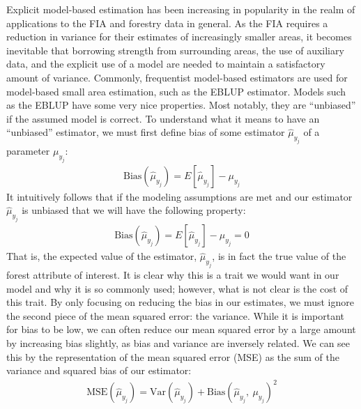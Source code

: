 \documentclass[12pt,twoside]{reedthesis}
\begin{document}
Explicit model-based estimation has been increasing in popularity in the realm of applications to the FIA and forestry data in general. As the FIA requires a reduction in variance for their estimates of increasingly smaller areas, it becomes inevitable that borrowing strength from surrounding areas, the use of auxiliary data, and the explicit use of a model are needed to maintain a satisfactory amount of variance. Commonly, frequentist model-based estimators are used for model-based small area estimation, such as the EBLUP estimator. Models such as the EBLUP have some very nice properties. Most notably, they are ``unbiased'' if the assumed model is correct. To understand what it means to have an ``unbiased'' estimator, we must first define bias of some estimator \(\hat\mu_{y_j}\) of a parameter \(\mu_{y_j}\):
\begin{align}
\text{Bias}(\hat\mu_{y_j}) = E[\hat\mu_{y_j}] - \mu_{y_j}
\end{align}
It intuitively follows that if the modeling assumptions are met and our estimator \(\hat\mu_{y_j}\) is unbiased that we will have the following property:
\begin{align}
\text{Bias}(\hat\mu_{y_j}) = E[\hat\mu_{y_j}] - \mu_{y_j} = 0
\end{align}
That is, the expected value of the estimator, \(\hat\mu_{y_j}\), is in fact the true value of the forest attribute of interest. It is clear why this is a trait we would want in our model and why it is so commonly used; however, what is not clear is the cost of this trait. By only focusing on reducing the bias in our estimates, we must ignore the second piece of the mean squared error: the variance. While it is important for bias to be low, we can often reduce our mean squared error by a large amount by increasing bias slightly, as bias and variance are inversely related. We can see this by the representation of the mean squared error (MSE) as the sum of the variance and squared bias of our estimator:
\begin{align}
\text{MSE}(\hat\mu_{y_j}) = \text{Var}(\hat\mu_{y_j}) + \text{Bias}(\hat\mu_{y_j},~ \mu_{y_j})^2
\end{align}
\end{document}
